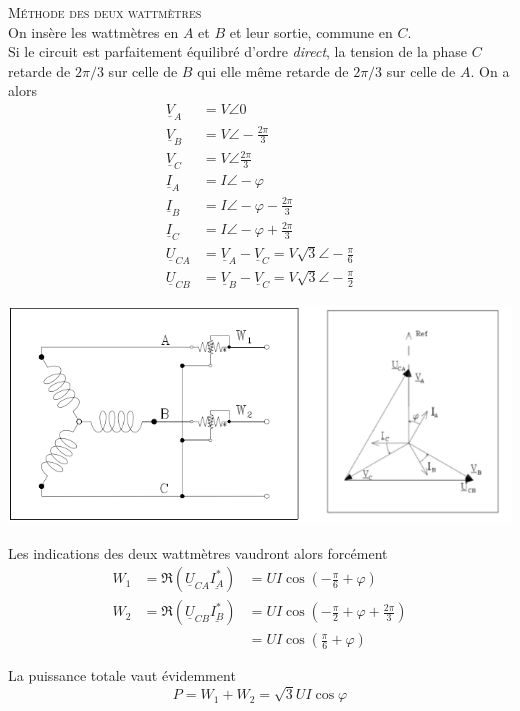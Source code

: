 \textsc{Méthode des deux wattmètres}\\
On insère les wattmètres en $A$ et $B$ et leur sortie, commune 
en $C$.\\
Si le circuit est parfaitement équilibré d'ordre \textit{direct}, 
la tension de la phase $C$ retarde de $2\pi/3$ sur celle de $B$ 
qui elle même retarde de $2\pi/3$ sur celle de $A$. On a alors
\begin{equation}
	\begin{array}{lll}
		\underline{V}_A    & = V \angle 0                                  \\
		\underline{V}_B    & = V\angle-\frac{2\pi}{3}                      \\
		\underline{V}_C    & = V\angle\frac{2\pi}{3}                       \\
		\underline{I}_A    & = I\angle-\varphi                             \\
		\underline{I}_B    & = I\angle-\varphi-\frac{2\pi}{3}              \\
		\underline{I}_C    & = I\angle-\varphi+\frac{2\pi}{3}              \\
		\underline{U}_{CA} & = \underline{V}_A-\underline{V}_C = V\sqrt{3} 
		\angle-\frac{\pi}{6}\\
		\underline{U}_{CB} & = \underline{V}_B-\underline{V}_C = V\sqrt{3  
		}\angle-\frac{\pi}{2}			
	\end{array}
\end{equation}
\begin{center}
	\includegraphics[scale=0.5]{ch1/image14.png}
\end{center}
Les indications des deux wattmètres vaudront alors forcément
\begin{equation}
	\begin{array}{lll}
		W_1 & = \Re(\underline{U}_{CA}\underline{I_A^*}) & = UI\cos(-\frac{\pi}{           
		6}+\varphi)\\
		W_2 & = \Re(\underline{U}_{CB}\underline{I_B^*}) & = UI\cos(-\frac{\pi}{           
		2}+\varphi+\frac{2\pi}{3})	\\
		    &                                            & = UI\cos(\frac{\pi}{6}+\varphi) 
	\end{array}
\end{equation}
			
La puissance totale vaut évidemment 
\begin{equation}
	P = W_1+W_2 = \sqrt{3}UI\cos\varphi
\end{equation}
		
		
		
		
		
		
		
		
		
		
		
		
		
		
		
		
		
		

